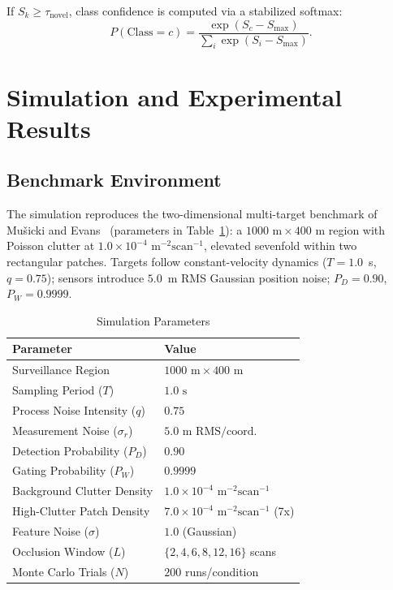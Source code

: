 \documentclass[conference]{IEEEtran}
\begin{document}
If $S_k \ge \tau_{\text{novel}}$, class confidence is computed via a stabilized softmax:
\begin{equation}
P(\text{Class} = c) = \frac{\exp(S_c - S_{\max})}{\sum_i \exp(S_i - S_{\max})}.
\end{equation}

\section{Simulation and Experimental Results}
\label{sec:results}

\subsection{Benchmark Environment}
The simulation reproduces the two-dimensional multi-target benchmark of Mušicki and Evans~\cite{musicki_2002_joint} (parameters in Table~\ref{tab:sim_params}): a $1000\text{ m} \times 400\text{ m}$ region with Poisson clutter at $1.0\times10^{-4}\text{ m}^{-2}\text{scan}^{-1}$, elevated sevenfold within two rectangular patches. Targets follow constant-velocity dynamics ($T=1.0$~s, $q=0.75$); sensors introduce $5.0$~m RMS Gaussian position noise; $P_D = 0.90$, $P_W = 0.9999$.

\begin{table}[!t]
\caption{Simulation Parameters}
\small
\label{tab:sim_params}
\centering
\begin{tabular}{ll}
\toprule
\textbf{Parameter} & \textbf{Value} \\
\midrule
Surveillance Region & $1000\text{ m} \times 400\text{ m}$ \\
Sampling Period ($T$) & $1.0\text{ s}$ \\
Process Noise Intensity ($q$) & $0.75$ \\
Measurement Noise ($\sigma_r$) & $5.0\text{ m RMS/coord.}$ \\
Detection Probability ($P_D$) & $0.90$ \\
Gating Probability ($P_W$) & $0.9999$ \\
Background Clutter Density & $1.0 \times 10^{-4}\text{ m}^{-2}\text{scan}^{-1}$ \\
High-Clutter Patch Density & $7.0 \times 10^{-4}\text{ m}^{-2}\text{scan}^{-1}$ (7x) \\
Feature Noise ($\sigma$) & $1.0$ (Gaussian) \\
Occlusion Window ($L$) & $\{2,4,6,8,12,16\}$ scans \\
Monte Carlo Trials ($N$) & $200$ runs/condition \\
\bottomrule
\end{tabular}
\end{table}
\end{document}
